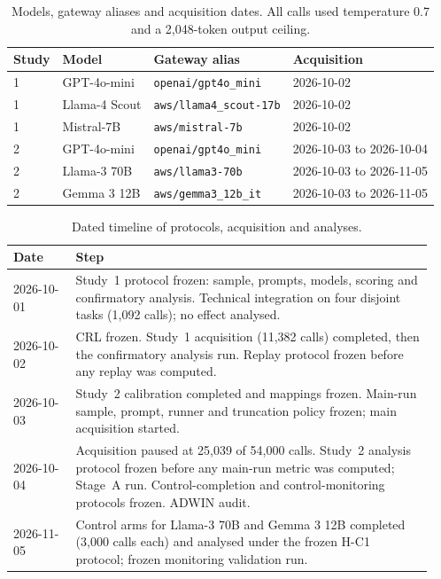 \documentclass[10pt]{article}
\begin{document}
\begin{table}[h]\centering\small
\caption{Models, gateway aliases and acquisition dates. All calls used
temperature 0.7 and a 2,048-token output ceiling.}
\label{tab:models}
\begin{tabular}{llll}\toprule
Study & Model & Gateway alias & Acquisition\\\midrule
1 & GPT-4o-mini & \texttt{openai/gpt4o\_mini} & 2026-10-02\\
1 & Llama-4 Scout & \texttt{aws/llama4\_scout-17b} & 2026-10-02\\
1 & Mistral-7B & \texttt{aws/mistral-7b} & 2026-10-02\\
2 & GPT-4o-mini & \texttt{openai/gpt4o\_mini} & 2026-10-03 to 2026-10-04\\
2 & Llama-3 70B & \texttt{aws/llama3-70b} & 2026-10-03 to 2026-11-05\\
2 & Gemma 3 12B & \texttt{aws/gemma3\_12b\_it} & 2026-10-03 to 2026-11-05\\
\bottomrule\end{tabular}\end{table}

\begin{table}[h]\centering\small
\caption{Dated timeline of protocols, acquisition and analyses.}
\label{tab:timeline}
\begin{tabular}{@{}p{0.14\linewidth}p{0.80\linewidth}@{}}\toprule
Date & Step\\\midrule
2026-10-01 & Study~1 protocol frozen: sample, prompts, models, scoring and
confirmatory analysis. Technical integration on four disjoint tasks (1,092
calls); no effect analysed.\\
2026-10-02 & CRL frozen. Study~1 acquisition (11,382 calls) completed, then the
confirmatory analysis run. Replay protocol frozen before any replay was
computed.\\
2026-10-03 & Study~2 calibration completed and mappings frozen. Main-run
sample, prompt, runner and truncation policy frozen; main acquisition
started.\\
2026-10-04 & Acquisition paused at 25,039 of 54,000 calls. Study~2 analysis
protocol frozen before any main-run metric was computed; Stage~A run.
Control-completion and control-monitoring protocols frozen. ADWIN audit.\\
2026-11-05 & Control arms for Llama-3 70B and Gemma 3 12B completed (3,000
calls each) and analysed under the frozen H-C1 protocol; frozen monitoring
validation run.\\
\bottomrule\end{tabular}\end{table}
\end{document}

